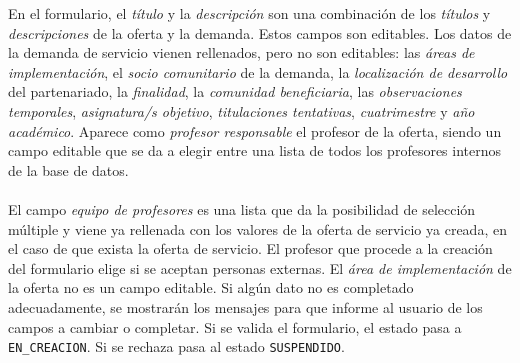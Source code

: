\documentclass[11pt]{book}
\begin{document}
	En el formulario, el \emph{título} y la \emph{descripción } son una combinación de los \emph{títulos} y \emph{descripciones} de la oferta y la demanda. Estos campos son editables. Los datos de la demanda de servicio vienen rellenados, pero no son editables:  las \emph{áreas de implementación}, el \emph{socio comunitario} de la demanda, la \emph{localización de desarrollo} del partenariado, la \emph{finalidad}, la \emph{comunidad beneficiaria}, las \emph{observaciones temporales}, \emph{asignatura/s objetivo}, \emph{titulaciones tentativas}, \emph{cuatrimestre} y \emph{año académico}. Aparece como \emph{profesor responsable} el profesor de la oferta, siendo un campo editable que se da a elegir entre una lista de todos los profesores internos de la base de datos.\\\\
	El campo \emph{equipo de profesores} es una lista que da la posibilidad de selección múltiple y viene ya rellenada con los valores de la oferta de servicio ya creada, en el caso de que exista la oferta de servicio. El profesor que procede a la creación del formulario elige si se aceptan personas externas. El \emph{área de implementación} de la oferta no es un campo editable. Si algún dato no es completado adecuadamente, se mostrarán los mensajes para que informe al usuario de los campos a cambiar o completar. Si se valida el formulario, el estado pasa a \texttt{EN\_CREACION}. Si se rechaza pasa al estado \texttt{SUSPENDIDO}.
	\\\\
\end{document}
